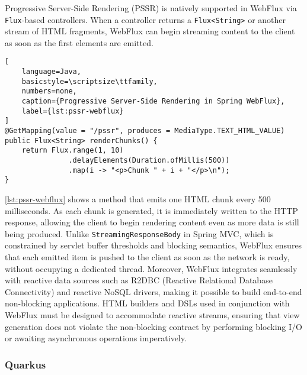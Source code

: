 Progressive Server-Side Rendering (PSSR) is natively supported in WebFlux via
\texttt{Flux}-based controllers. When a controller returns a
\texttt{Flux<String>} or another stream of HTML fragments, WebFlux can begin
streaming content to the client as soon as the first elements are emitted.

\begin{lstlisting}[
    language=Java,
    basicstyle=\scriptsize\ttfamily,
    numbers=none,
    caption={Progressive Server-Side Rendering in Spring WebFlux},
    label={lst:pssr-webflux}
]
@GetMapping(value = "/pssr", produces = MediaType.TEXT_HTML_VALUE)
public Flux<String> renderChunks() {
    return Flux.range(1, 10)
               .delayElements(Duration.ofMillis(500))
               .map(i -> "<p>Chunk " + i + "</p>\n");
}
\end{lstlisting}

\autoref{lst:pssr-webflux} shows a method that emits one HTML chunk every 500 milliseconds. As
each chunk is generated, it is immediately written to the HTTP response,
allowing the client to begin rendering content even as more data is still being
produced. Unlike \texttt{StreamingResponseBody} in Spring MVC, which is
constrained by servlet buffer thresholds and blocking semantics, WebFlux
ensures that each emitted item is pushed to the client as soon as the network
is ready, without occupying a dedicated thread. Moreover, WebFlux integrates
seamlessly with reactive data sources such as R2DBC (Reactive Relational
Database Connectivity) and reactive NoSQL drivers, making it possible to build
end-to-end non-blocking applications. HTML builders and DSLs used in
conjunction with WebFlux must be designed to accommodate reactive streams,
ensuring that view generation does not violate the non-blocking contract by
performing blocking I/O or awaiting asynchronous operations imperatively.

\subsubsection{Quarkus}

